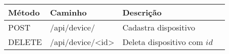 \begin{tabular}{llll}
\toprule
Método & Caminho       & Descrição  \\  
\midrule
POST   & /api/device/ & Cadastra dispositivo \\
\midrule
DELETE & /api/device/<id> & Deleta dispositivo com $id$ \\
\bottomrule
\end{tabular}
